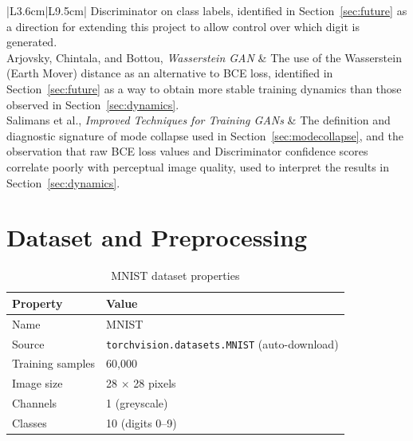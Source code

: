 \documentclass[12pt,a4paper]{article}
\begin{document}
\begin{center}
\begin{longtable}{|L{3.6cm}|L{9.5cm}|}
            Discriminator on class labels, identified in Section~\ref{sec:future} as a
            direction for extending this project to allow control over which digit is
            generated. \\
            \hline
            Arjovsky, Chintala, and Bottou, \textit{Wasserstein GAN} \cite{arjovsky2017} &
            The use of the Wasserstein (Earth Mover) distance as an alternative to BCE
            loss, identified in Section~\ref{sec:future} as a way to obtain more stable
            training dynamics than those observed in Section~\ref{sec:dynamics}. \\
            \hline
            Salimans et al., \textit{Improved Techniques for Training GANs}
            \cite{salimans2016} & The definition and diagnostic signature of mode
            collapse used in Section~\ref{sec:modecollapse}, and the observation that raw
            BCE loss values and Discriminator confidence scores correlate poorly with
            perceptual image quality, used to interpret the results in
            Section~\ref{sec:dynamics}. \\
            \hline
    \end{longtable}
\end{center}

\section{Dataset and Preprocessing}

\begin{table}[H]
    \begin{center}
        \begin{tabular}{|l|l|}
            \hline
            \textbf{Property} & \textbf{Value} \\
            \hline
            Name & MNIST \\
            \hline
            Source & \texttt{torchvision.datasets.MNIST} (auto-download) \\
            \hline
            Training samples & 60,000 \\
            \hline
            Image size & 28 $\times$ 28 pixels \\
            \hline
            Channels & 1 (greyscale) \\
            \hline
            Classes & 10 (digits 0--9) \\
            \hline
        \end{tabular}
        \caption{MNIST dataset properties}
    \end{center}
\end{table}
\end{document}
